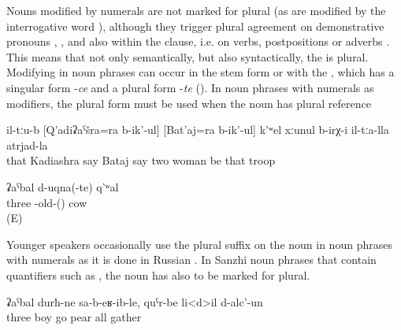 Nouns modified by numerals are not marked for plural (as are  modified by the interrogative word  ), although they trigger plural agreement on demonstrative pronouns ,  , and also within the clause, i.e. on verbs, postpositions or adverbs . This means that not only semantically, but also syntactically, the  is plural. Modifying  in noun phrases can occur in the stem form or with the , which has a singular form -\textit{ce} and a plural form -\textit{te} (). In noun phrases with numerals as modifiers, the plural form must be used when the noun has plural reference 

\begin{exe}
	\ex	\label{ex:There were two women of their troops called Kadiashra and Bataj@5}
	\gll	il-tːu-b	[Q'adiʡaˁšra=ra	b-ik'-ul]	[Bat'aj=ra	b-ik'-ul]		k'ʷel	xːunul	b-irχ-i	il-tːa-lla	atrjad-la\\
		that	Kadiashra	say	Bataj	say		two	woman	be	that	troop\\
	\glt	{}
	
	\ex	\label{three old cowsNP}
	\gll ʡaˁbal	d-uqna(-te)	q'ʷal\\
	three	-old-() 	cow\\
	\glt	{} (E)
\end{exe}


Younger speakers occasionally use the plural suffix on the noun in noun phrases with numerals as it is done in Russian . In Sanzhi noun phrases that contain quantifiers such as   , the noun has also to be marked for plural.

\begin{exe}
	\ex	\label{ex:Three boys came and gathered all the pears@6}
	\gll	ʡaˁbal	durħ-ne	sa-b-eʁ-ib-le,	quˁr-be	li<d>il		d-alc'-un\\
		three	boy	go	pear	all	gather\\
	\glt	{}
\end{exe}



